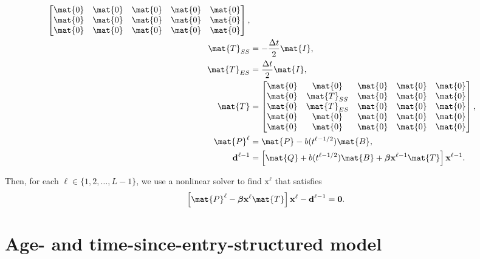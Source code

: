 \documentclass{jpmarticle}
\renewcommand{\vec}[1]{\boldsymbol{\mathrm{#1}}}
\let\subequationsorig\subequations%
\let\endsubequationsorig\endsubequations%
\renewenvironment{subequations}{
  \subequationsorig
  \renewcommand{\theequation}{\theparentequation.\arabic{equation}}
}{
  \endsubequationsorig
}
\begin{document}
\begin{subequations}
\begin{align}
\begin{bmatrix}
      \mat{0} & \mat{0} & \mat{0} & \mat{0} & \mat{0}
      \\
      \mat{0} & \mat{0} & \mat{0} & \mat{0} & \mat{0}
      \\
      \mat{0} & \mat{0} & \mat{0} & \mat{0} & \mat{0}
    \end{bmatrix},
    \\
    \mat{T}_{SS} &=
    - \frac{\Delta t}{2} \mat{I},
    \\
    \mat{T}_{ES} &=
    \frac{\Delta t}{2} \mat{I},
    \\
    \mat{T} &=
    \begin{bmatrix}
      \mat{0} & \mat{0} & \mat{0} & \mat{0} & \mat{0}
      \\
      \mat{0} & \mat{T}_{SS} & \mat{0} & \mat{0} & \mat{0}
      \\
      \mat{0} & \mat{T}_{ES} & \mat{0} & \mat{0} & \mat{0}
      \\
      \mat{0} & \mat{0} & \mat{0} & \mat{0} & \mat{0}
      \\
      \mat{0} & \mat{0} & \mat{0} & \mat{0} & \mat{0}
    \end{bmatrix},
    \\
    \mat{P}^{\ell} &=
    \mat{P} - b(t^{\ell - 1 / 2}) \mat{B},
    \\
    \vec{d}^{\ell - 1} &=
    \left[
      \mat{Q}
      + b(t^{\ell - 1 / 2}) \mat{B}
      + \vec{\beta} \vec{x}^{\ell - 1} \mat{T}
    \right] \vec{x}^{\ell - 1}.
  \end{align}
\end{subequations}
Then, for each $\ell \in \{1, 2, \ldots, L - 1\}$,
we use a nonlinear solver to find $\vec{x}^{\ell}$ that satisfies
\begin{equation}
  \left[
    \mat{P}^{\ell}
    - \vec{\beta} \vec{x}^{\ell} \mat{T}
  \right] \vec{x}^{\ell}
  - \vec{d}^{\ell - 1}
  = \vec{0}.
\end{equation}


\section{Age- and time-since-entry-structured model}
\end{document}
